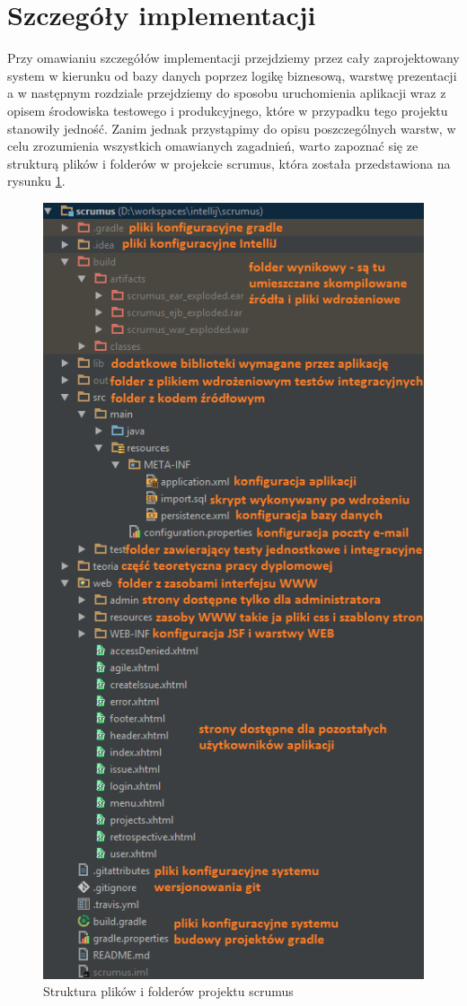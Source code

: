 \section{Szczegóły implementacji}
Przy omawianiu szczegółów implementacji przejdziemy przez cały zaprojektowany system w kierunku od bazy danych poprzez logikę biznesową, warstwę prezentacji a w następnym rozdziale przejdziemy do sposobu uruchomienia aplikacji wraz z opisem środowiska testowego i produkcyjnego, które w przypadku tego projektu stanowiły jedność. Zanim jednak przystąpimy do opisu poszczególnych warstw, w celu zrozumienia wszystkich omawianych zagadnień, warto zapoznać się ze strukturą plików i folderów w projekcie scrumus, która została przedstawiona na rysunku \ref{fig:struktura_intellij}.

\begin{figure}[tp]
	\centering
	\includegraphics[width=12cm]{rysunki/struktura_intellij.png}	
	\caption{Struktura plików i folderów projektu scrumus}
	\label{fig:struktura_intellij}
\end{figure}

